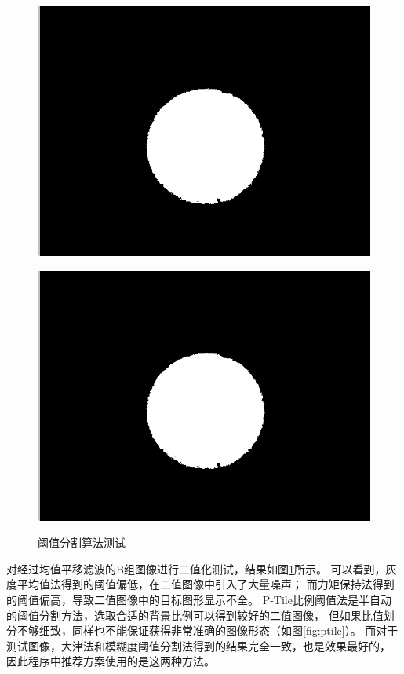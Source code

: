 \documentclass[12pt,a4paper]{article}
\begin{document}
\begin{figure}[!htbp]
\begin{minipage}{0.48\linewidth}
        \includegraphics[width=\linewidth]{otsu.png}
        \label{fig:otsu}
    \end{minipage} \hfill
    \begin{minipage}{0.48\linewidth}
        \centering
        \includegraphics[width=\linewidth]{fuzziness.png}
        \label{fig:fuzziness}
    \end{minipage}
    \caption{阈值分割算法测试}\label{fig:threshold}
\end{figure}

对经过均值平移滤波的B组图像进行二值化测试，结果如图\ref{fig:threshold}所示。
可以看到，灰度平均值法得到的阈值偏低，在二值图像中引入了大量噪声；
而力矩保持法得到的阈值偏高，导致二值图像中的目标图形显示不全。
P-Tile比例阈值法是半自动的阈值分割方法，选取合适的背景比例可以得到较好的二值图像，
但如果比值划分不够细致，同样也不能保证获得非常准确的图像形态（如图\ref{fig:ptile}）。
而对于测试图像，大津法和模糊度阈值分割法得到的结果完全一致，也是效果最好的，
因此程序中推荐方案使用的是这两种方法。
\end{document}
